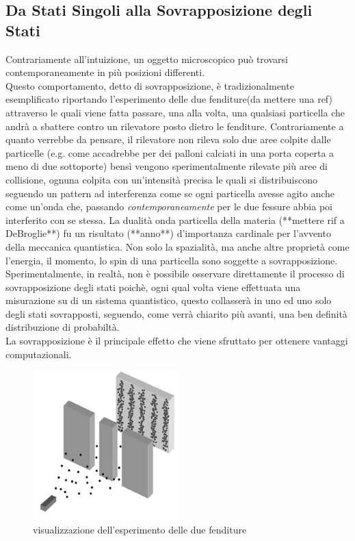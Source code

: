 \documentclass[12pt,a4paper,openright]{report}
\begin{document}
\subsection{Da Stati Singoli alla Sovrapposizione degli Stati}
  Contrariamente all'intuizione, un oggetto microscopico può trovarsi contemporaneamente in più posizioni differenti.\\
  Questo comportamento, detto di sovrapposizione, è tradizionalmente esemplificato riportando l'esperimento delle due fenditure(da mettere una ref) attraverso le quali viene 
  fatta passare, una alla volta, una qualsiasi particella che andrà a sbattere contro un rilevatore posto dietro le fenditure. Contrariamente a quanto verrebbe da pensare,
  il rilevatore non rileva solo due aree colpite dalle particelle (e.g. come accadrebbe per dei palloni calciati in una porta coperta a meno di due sottoporte) bensì vengono 
  sperimentalmente rilevate più aree di collisione, ognuna colpita con un'intensità precisa le quali si distribuiscono seguendo un pattern ad interferenza
  come se ogni particella avesse agito anche come un'onda che, passando \emph{contemporaneamente} per le due fessure abbia poi interferito con se stessa.
  La dualità onda particella della materia (**mettere rif a DeBroglie**) fu un risultato (**anno**) d'importanza cardinale per l'avvento della meccanica quantistica.
  Non solo la spazialità, ma anche altre proprietà come l'energia, il momento, lo spin di una particella sono soggette a sovrapposizione.
  Sperimentalmente, in realtà, non è possibile osservare direttamente il processo di sovrapposizione degli stati poichè, ogni qual volta viene effettuata una misurazione su di un
  sistema quantistico, questo collasserà in uno ed uno solo degli stati sovrapposti, seguendo, come verrà chiarito più avanti, una ben definità distribuzione di probabiltà.\\
  La sovrapposizione è il principale effetto che viene sfruttato per ottenere vantaggi computazionali. 
\begin{figure}[h]
    \centering
    \includegraphics[width=0.5\textwidth]{double-slit-electrons1}
    \caption{visualizzazione dell'esperimento delle due fenditure}
\end{figure}
  
\end{document}
